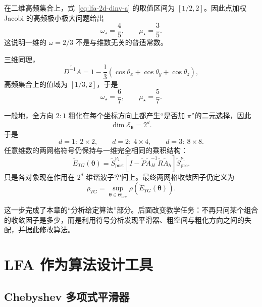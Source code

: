 在二维高频集合上，式~\eqref{eq:lfa-2d-dinv-a} 的取值区间为 $[1/2,2]$。因此点加权 Jacobi 的高频极小极大问题给出
\begin{equation}
\omega_\star=\frac45,
\qquad
\mu_\star=\frac35.
\label{eq:lfa-2d-jacobi-optimal}
\end{equation}
这说明一维的 $\omega=2/3$ 不是与维数无关的普适常数。

三维同理，
\begin{equation}
\widetilde{D^{-1}A}
=
1-\frac13(
\cos\theta_x+\cos\theta_y+\cos\theta_z),
\end{equation}
高频集合上的值域为 $[1/3,2]$，于是
\begin{equation}
\omega_\star=\frac67,
\qquad
\mu_\star=\frac57.
\label{eq:lfa-3d-jacobi-optimal}
\end{equation}

一般地，全方向 $2{:}1$ 粗化在每个坐标方向上都产生“是否加 $\pi$”的二元选择，因此
\begin{equation}
\boxed{
\dim\mathcal E_{\bm\theta}=2^d.
}
\label{eq:lfa-harmonic-space-dimension}
\end{equation}
于是
\begin{equation}
d=1:\ 2\times2,
\qquad
d=2:\ 4\times4,
\qquad
d=3:\ 8\times8.
\end{equation}
任意维数的两网格符号仍保持与一维完全相同的乘积结构：
\begin{equation}
\boxed{
\widetilde E_{TG}(\bm\theta)
=
\widetilde S_{\mathrm{post}}^{\nu_2}
\left[
I-\widetilde P
\widetilde A_H^{-1}
\widetilde R
\widetilde A_h
\right]
\widetilde S_{\mathrm{pre}}^{\nu_1}.
}
\label{eq:lfa-general-two-grid-symbol}
\end{equation}
只是各对象现在作用在 $2^d$ 维谐波子空间上。最终两网格收敛因子仍定义为
\begin{equation}
\boxed{
\rho_{TG}
=
\sup_{\bm\theta\in\Theta_{\mathrm{low}}}
\rho\!\left(
\widetilde E_{TG}(\bm\theta)
\right).
}
\label{eq:lfa-general-two-grid-factor}
\end{equation}

这一步完成了本章的“分析给定算法”部分。后面改变教学任务：不再只问某个组合的收敛因子是多少，而是利用符号分析发现平滑器、粗空间与粗化方向之间的失配，并据此修改算法。

\section{LFA 作为算法设计工具}
\label{sec:lfa-design-tool}

\subsection{Chebyshev 多项式平滑器}

